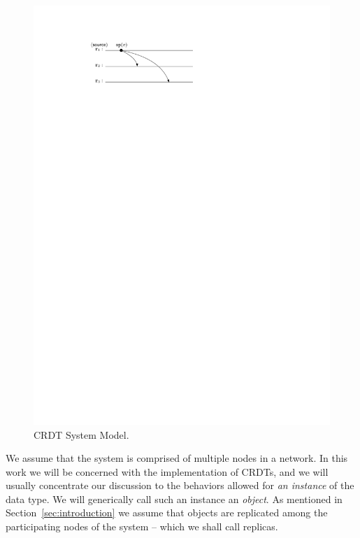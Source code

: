 \begin{figure}
\vspace{-4mm}
  \centering
  \includegraphics[scale=.7]{figures/sys-mod}
  \caption{CRDT System Model.}
  \label{fig:sys-mod}
\end{figure}
We assume that the system is comprised of multiple nodes in a network.
In this work we will be concerned with the implementation of CRDTs,
and we will usually concentrate our discussion to the behaviors
allowed for \emph{an instance} of the data type.
We will generically call such an instance an \emph{object}.
As mentioned in Section~\ref{sec:introduction} we assume that objects are
replicated among the participating nodes of the system -- which we shall call replicas.

